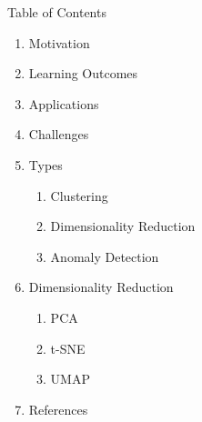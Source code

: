 \begin{frame}[allowframebreaks]{Table of Contents}
\begin{enumerate}
    \setlength{\itemsep}{-0.2em}
    \item Motivation
    \item Learning Outcomes
    \item Applications
    \item Challenges
    \item Types
        \begin{enumerate}
            \setlength{\itemsep}{-0.5em}
            \item Clustering
            \item Dimensionality Reduction
            \item Anomaly Detection
        \end{enumerate}
    \item Dimensionality Reduction
        \begin{enumerate}
            \setlength{\itemsep}{-0.5em}
            \item PCA
            \item t-SNE
            \item UMAP
        \end{enumerate}
    \item References
\end{enumerate}
\end{frame}